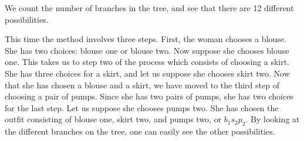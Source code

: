 \begin{solution}
\begin{center}
    \end{center}

    We count the number of branches in the tree, and see that there are 12 different possibilities.

    This time the method involves three steps. First, the woman chooses a blouse. She has two choices: blouse one or blouse two.  Now suppose she chooses blouse one. This takes us to step two of the process which consists of choosing a skirt. She has three choices for a skirt, and let us suppose she chooses skirt two. Now that she has chosen a blouse and a skirt, we have moved to the third step of choosing a pair of pumps. Since she has two pairs of pumps, she has two choices for the last step. Let us suppose she chooses pumps two. She has chosen the outfit consisting of blouse one, skirt two, and pumps two, or $b_1s_2p_2$. By looking at the different branches on the tree, one can easily see the other possibilities.


\end{solution}

